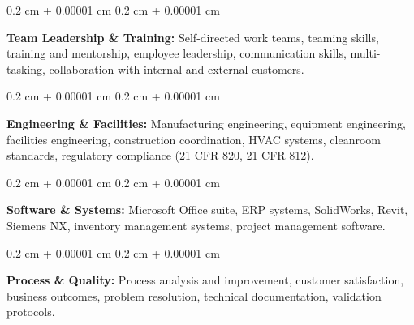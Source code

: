 \documentclass[10pt, letterpaper]{article}
\newenvironment{onecolentry}{
    \begin{adjustwidth}{
        0.2 cm + 0.00001 cm
    }{
        0.2 cm + 0.00001 cm
    }
}{
    \end{adjustwidth}
} %
\begin{document}
        \begin{onecolentry}
            \textbf{Team Leadership \& Training:} Self-directed work teams, teaming skills, training and mentorship, employee leadership, communication skills, multi-tasking, collaboration with internal and external customers.
        \end{onecolentry}

        \vspace{0.2 cm}

        \begin{onecolentry}
            \textbf{Engineering \& Facilities:} Manufacturing engineering, equipment engineering, facilities engineering, construction coordination, HVAC systems, cleanroom standards, regulatory compliance (21 CFR 820, 21 CFR 812).
        \end{onecolentry}

        \vspace{0.2 cm}

        \begin{onecolentry}
            \textbf{Software \& Systems:} Microsoft Office suite, ERP systems, SolidWorks, Revit, Siemens NX, inventory management systems, project management software.
        \end{onecolentry}

        \vspace{0.2 cm}

        \begin{onecolentry}
            \textbf{Process \& Quality:} Process analysis and improvement, customer satisfaction, business outcomes, problem resolution, technical documentation, validation protocols.
        \end{onecolentry}


    
\end{document}
